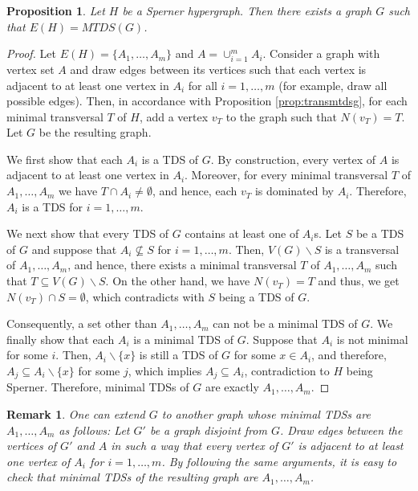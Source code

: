 \documentclass[11pt]{article}
\newtheorem{proposition}[theorem]{Proposition}
\newtheorem{remark}[theorem]{Remark}
\theoremstyle{definition}
\begin{document}
\begin{proposition}\label{prop:spernermtdsg}
Let $H$ be a Sperner hypergraph.
Then there exists a graph $G$ such that $E(H)=MTDS(G)$.
\end{proposition}
\begin{proof}
Let $E(H)=\{A_1,\dots, A_m \}$ and $A=\cup _{i=1}^m A_i$.
Consider a graph with vertex set $A$ and draw edges between its vertices such that each vertex is adjacent to at least one vertex in $A_i$ for all $i=1,\dots,m$ (for example, draw all possible edges).
Then, in accordance with Proposition \ref{prop:transmtdsg}, for each minimal transversal $T$ of $H$, add a vertex $v_T$ to the graph such that $N(v_T)=T$.
Let $G$ be the resulting graph.

We first show that each $A_i$ is a TDS of $G$.
By construction, every vertex of $A$ is adjacent to at least one vertex in $A_i$.
Moreover, for every minimal transversal $T$ of $A_1,\dots,A_m$ we have $T\cap A_i\neq \emptyset$,
and hence, each $v_T$ is dominated by $A_i$.
Therefore, $A_i$ is a TDS for $i=1,\dots,m$.

We next show that every TDS of $G$ contains at least one of $A_i$s.
Let $S$ be a TDS of $G$ and suppose that $A_i \nsubseteq S$ for $i=1,\dots,m$.
Then, $V(G)\backslash S$ is a transversal of $A_1,\dots,A_m$, and hence,
there exists a minimal transversal $T$ of $A_1,\dots,A_m$ such that $T\subseteq V(G)\backslash S$.
On the other hand, we have $N(v_T)=T$ and thus, we get $N(v_T)\cap S=\emptyset$, which contradicts with $S$ being a TDS of $G$.

Consequently, a set other than $A_1,\dots,A_m$ can not be a minimal TDS of $G$.
We finally show that each $A_i$ is a minimal TDS of $G$.
Suppose that $A_i$ is not minimal for some $i$.
Then, $A_i\backslash \{x\}$ is still a TDS of $G$ for some $x\in A_i$, and therefore,
$A_j \subseteq A_i\backslash \{x\} $ for some $j$, which implies $A_j \subseteq A_i$, contradiction to $H$ being Sperner.
Therefore, minimal TDSs of $G$ are exactly $A_1,\dots, A_m$.
\end{proof}

\begin{remark}
One can extend $G$ to another graph whose minimal TDSs are $A_1,\dots, A_m$ as follows:
Let $G'$ be a graph disjoint from $G$.
Draw edges between the vertices of $G'$ and $A$ in such a way that every vertex of $G'$ is adjacent to at least one vertex of $A_i$ for $i=1,\dots,m$.
By following the same arguments, it is easy to check that minimal TDSs of the resulting graph are $A_1,\dots,A_m$.
\end{remark}
\end{document}
